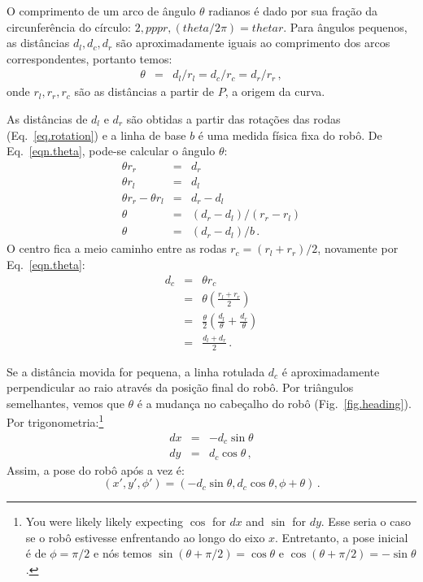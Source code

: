 {O comprimento de um arco de ângulo $\theta$ radianos é dado por sua fração da circunferência do círculo: $2,ppp r,(theta/2\pi)=theta r$. Para ângulos pequenos, as distâncias $d_l,d_c,d_r$ são aproximadamente iguais ao comprimento dos arcos correspondentes, portanto temos:
\begin{eqnarray}
\theta &=& d_l/r_l = d_c/r_c = d_r/r_r\,,\label{eqn.theta}
\end{eqnarray}
onde $r_l, r_r, r_c$ são as distâncias a partir de $P$, a origem da curva.

As distâncias de $d_l$ e $d_r$ são obtidas a partir das rotações das rodas (Eq.~\ref{eq.rotation}) e a linha de base $b$ é uma medida física fixa do robô. De Eq.~\ref{eqn.theta}, pode-se calcular o ângulo $\theta$:
\begin{eqnarray*}
\theta r_r &=& d_r\\
\theta r_l &=& d_l\\
\theta r_r - \theta r_l &=& d_r - d_l\\
\theta &=& (d_r - d_l) / (r_r - r_l)\\
\theta &=& (d_r - d_l) / b\,.
\end{eqnarray*}
O centro fica a meio caminho entre as rodas $r_c =(r_l+r_r)/2$,
novamente por Eq.~\ref{eqn.theta}:
\begin{eqnarray*}
d_c&=&\theta r_c\\
&=&\theta \left(\frac{r_l+r_r}{2}\right)\\
&=&\frac{\theta}{2} \left(\frac{d_l}{\theta} + \frac{d_r}{\theta}\right)\\
&=&\frac{d_l+d_r}{2}\,.
\end{eqnarray*}

Se a distância movida for pequena, a linha rotulada $d_c$ é aproximadamente
perpendicular ao raio através da posição final do robô. Por triângulos semelhantes, vemos que $\theta$ é a mudança no cabeçalho do robô (Fig.~\ref{fig.heading}). Por trigonometria:\footnote{You were likely likely expecting $\cos$ for $dx$ and $\sin$ for $dy$. Esse seria o caso se o robô estivesse enfrentando ao longo do eixo $x$. Entretanto, a pose inicial é de $\phi=\pi/2$ e nós temos $\sin(\theta+\pi/2)=\cos\theta$ e $\cos(\theta+\pi/2)=-\sin\theta$.}
\begin{eqnarray*}
\textit{dx} &=& - d_c \sin \theta\\
\textit{dy} &=& d_c \cos \theta\,,
\end{eqnarray*}
Assim, a pose do robô após a vez é:
\[
(x',y',\phi') = ( - d_c \sin \theta, d_c \cos \theta, \phi+\theta)\,.
\]

}
